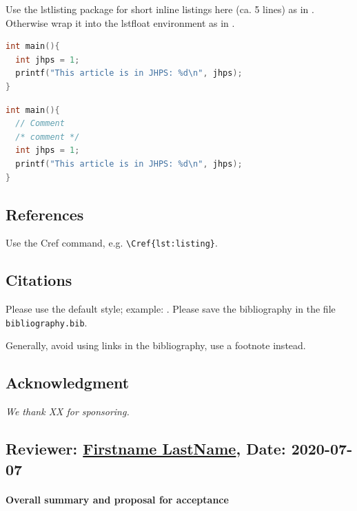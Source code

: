 \documentclass{jhps}
\begin{document}
Use the lstlisting package for short inline listings here (ca. 5 lines) as in .
Otherwise wrap it into the lstfloat environment as in .

\begin{lstlisting}[caption="My listing",label=lst:listing,language=C]
int main(){
  int jhps = 1;
  printf("This article is in JHPS: %d\n", jhps);
}
\end{lstlisting}

\begin{lstfloat}
  \begin{lstlisting}[caption="My longer listing",label=lst:longlisting,language=C]
int main(){
  // Comment
  /* comment */
  int jhps = 1;
  printf("This article is in JHPS: %d\n", jhps);
}
  \end{lstlisting}
\end{lstfloat}


\subsection{References}

Use the Cref command, e.g. \verb|\Cref{lst:listing}|.

\subsection{Citations}

Please use the default style; example: \cite{misc1998}.
Please save the bibliography in the file \texttt{bibliography.bib}.

Generally, avoid using links in the bibliography, use a footnote instead.

\subsection*{Acknowledgment} %
\textit{We thank XX for sponsoring.}



\reviews %

\subsection*{Reviewer: \href{Optional URL to reviewer page}{Firstname LastName}, Date: 2020-07-07}

\paragraph{Overall summary and proposal for acceptance}
\end{document}
